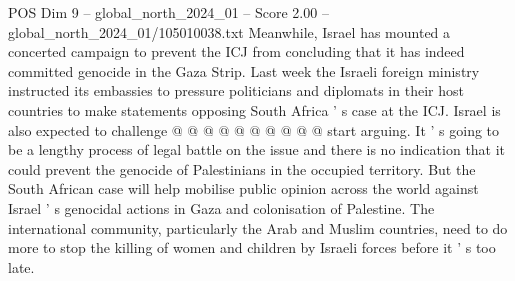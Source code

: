 \begin{textsample}{POS Dim 9 – global\_north\_2024\_01 – Score 2.00 – global\_north\_2024\_01/105010038.txt}
Meanwhile, Israel has mounted a concerted campaign to prevent the ICJ from concluding that it has indeed committed genocide in the Gaza Strip.
Last week the Israeli foreign ministry instructed its embassies to pressure politicians and diplomats in their host countries to make statements opposing South Africa ' s case at the ICJ.
Israel is also expected to challenge @ @ @ @ @ @ @ @ @ @ start arguing.
It ' s going to be a lengthy process of legal battle on the issue and there is no indication that it could prevent the genocide of Palestinians in the occupied territory.
But the South African case will help mobilise public opinion across the world against Israel ' s genocidal actions in Gaza and colonisation of Palestine.
The international community, particularly the Arab and Muslim countries, need to do more to stop the killing of women and children by Israeli forces before it ' s too late.

\end{textsample}
